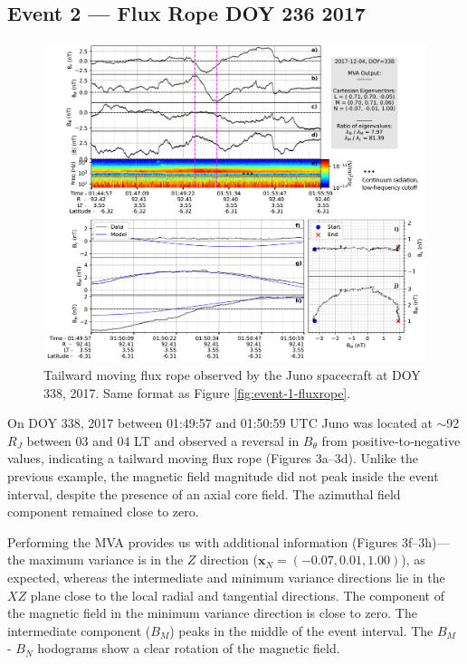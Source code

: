 \subsection{Event 2 — Flux Rope DOY 236 2017}

\begin{figure}
    \centering
    \includegraphics[width=\textwidth]{images5/event-2-fluxrope.jpg}
    \caption{Tailward moving flux rope observed by the Juno spacecraft at DOY 338, 2017. Same format as Figure \ref{fig:event-1-fluxrope}.}
    \label{fig:event-2-fluxrope}
\end{figure}

On DOY 338, 2017 between 01:49:57 and 01:50:59 UTC Juno was located at $\sim$92 $R_J$ between 03 and 04 LT and observed a reversal in $B_\theta$ from positive‐to‐negative values, indicating a tailward moving flux rope (Figures 3a–3d). Unlike the previous example, the magnetic field magnitude did not peak inside the event interval, despite the presence of an axial core field. The azimuthal field component remained close to zero.

Performing the MVA provides us with additional information (Figures 3f–3h)—the maximum variance is in the $Z$ direction ($\mathbf{x}_N=(-0.07,0.01,1.00)$), as expected, whereas the intermediate and minimum variance directions lie in the $XZ$ plane close to the local radial and tangential directions. The component of the magnetic field in the minimum variance direction is close to zero. The intermediate component ($B_M$) peaks in the middle of the event interval. The $B_M$ - $B_N$ hodograms show a clear rotation of the magnetic field.

